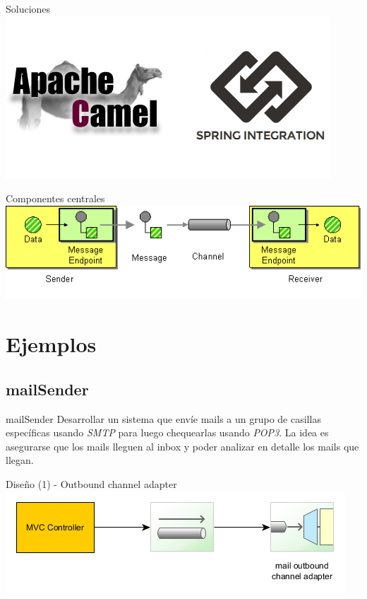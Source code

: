 \documentclass{beamer}
\begin{document}
\begin{frame}{Soluciones}
\includegraphics[width= 0.9\linewidth]{camel-spring}
\end{frame}

\begin{frame}{Componentes centrales}
\includegraphics[width=1.0\linewidth]{MessageEndpointSolution}
\end{frame}

\section{Ejemplos}
\subsection{mailSender}

\begin{frame}
\begin{exampleblock}{mailSender}
Desarrollar un sistema que envíe mails a un grupo de casillas específicas usando \textit{SMTP} para luego chequearlas usando \textit{POP3}. La idea es asegurarse que los mails lleguen al inbox y poder analizar en detalle los mails que llegan.
\end{exampleblock}
\end{frame}

\begin{frame}{Diseño (1) - Outbound channel adapter}
\includegraphics[width=1.0\linewidth]{sp-int-01}
\end{frame}
\end{document}
